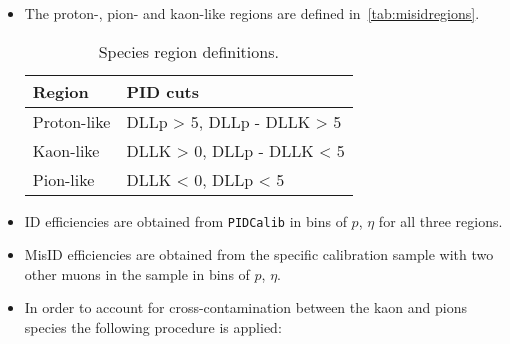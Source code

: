 \begin {itemize}
\item The proton-, pion- and kaon-like regions are defined in~\autoref{tab:misidregions}.

\begin{table}[ht]
\begin{center}
\begin{tabular}[t]{ l  l }
\toprule
Region & PID cuts  \\ \hline
	Proton-like & DLLp  > 5, DLLp - DLLK > 5 \\
Kaon-like & DLLK > 0, DLLp - DLLK < 5 \\
Pion-like & DLLK < 0, DLLp < 5 \\ \bottomrule
\end{tabular}
\end{center}
\caption{Species region definitions.}
\label{tab:misidregions}
\end{table}

\item ID efficiencies are obtained from \texttt{PIDCalib} in bins of $p$, $\eta$ for all three regions.
\item MisID efficiencies are obtained from the specific calibration sample with two other muons in the sample in bins of $p$, $\eta$.
\item In order to account for cross-contamination between the kaon and pions species the following procedure is applied:


\end{itemize}
